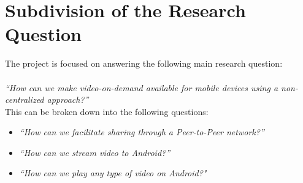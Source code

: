 \section{Subdivision of the Research Question}
The project is focused on answering the following main research question:\\
\\
\textit{``How can we make video-on-demand available for mobile devices using a non-centralized approach?''}\\

This can be broken down into the following questions:

\begin{itemize}
	\item\textit{``How can we facilitate sharing through a Peer-to-Peer network?''}
	\item\textit{``How can we stream video to Android?''}
	\item\textit{``How can we play any type of video on Android?"}
\end{itemize}
